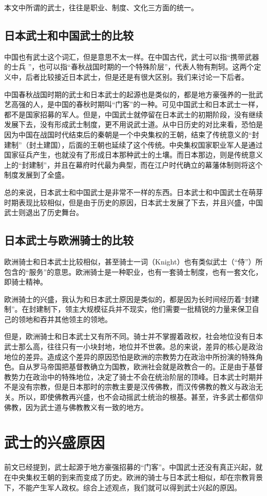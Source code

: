 \documentclass[utf8,a4paper]{ctexart}
\begin{document}
本文中所谓的武士，往往是职业、制度、文化三方面的统一。
\subsection{日本武士和中国武士的比较}
中国也有武士这个词汇，但是意思不太一样。在中国古代，武士可以指“携带武器的士兵
”，也可以指“春秋战国时期的一个特殊阶层”，代表人物有荆轲\cite{wushi13}。这两个定义中，后者比较接近日本武士，但是还是有很大区别。我们来讨论一下后者。

中国春秋战国时期的武士和日本武士的起源也是类似的，都是地方豪强养的一批武艺高强的人，是中国的春秋时期叫“门客”的一种。可见中国武士和日本武士一样，都不是国家招募的军人。但是，中国武士就停留在日本武士的初期阶段，没有继续发展下去，没有形成武士制度，更不用说武士道。从中日历史的对比来看，恐怕是因为中国在战国时代结束后的秦朝是一个中央集权的王朝，结束了传统意义的“封建制”（封土建国），后面的王朝也延续了这个传统。中央集权国家职业军人是通过国家征兵产生，也就没有了形成日本那种武士的土壤。而日本那边，则是传统意义上的“封建制”，并且在幕府时代最为典型，而在江户时代确立的幕藩体制则将这个制度发展到了全盛\cite{shi91}。

总的来说，日本武士和中国武士是非常不一样的东西。日本武士和中国武士在萌芽时期表现比较相似，但是由于历史的原因，日本武士发展了下去，并且兴盛，中国武士则退出了历史舞台。
\subsection{日本武士与欧洲骑士的比较}
欧洲骑士和日本武士比较相似，甚至骑士一词（Knight）也有类似武士（“侍”）所包含的“服务”的意思\cite{knight13}。欧洲骑士是一种职业，也有一套骑士制度，也有一套文化，即骑士精神。

欧洲骑士的兴盛，我认为和日本武士原因是类似的，都是因为长时间经历着“封建制”。在封建制下，领主大规模征兵并不现实，他们需要一批精锐的力量来保卫自己的领地和吞并其他领主的领地。

但是，欧洲骑士和日本武士又有所不同。骑士并不掌握着政权，社会地位没有日本武士那么高，往往只有一小块封地，地位并不世袭\cite{edge88}。总的来说，差异的核心是政治地位的差异。造成这个差异的原因恐怕是欧洲的宗教势力在政治中所扮演的特殊角色。自从罗马帝国把基督教确立为国教，欧洲社会就是政教合一的。正是由于基督教势力在政治中的特殊地位，决定了骑士不会在统治阶层的顶峰。日本武士时期并不是没有宗教，但是日本那时的宗教主要是汉传佛教，而汉传佛教的教义与政治无关。所以，即使佛教再兴盛，也不会动摇武士统治的根基。甚至，许多武士都信仰佛教，因为武士道与佛教教义有一致的地方\cite{liu99}。

\section{武士的兴盛原因}
前文已经提到，武士起源于地方豪强招募的“门客”。中国武士还没有真正兴起，就在中央集权王朝的到来而变成了历史。欧洲的骑士与日本武士相似，却在宗教背景下，不能产生军人政权。综合上述观点，我们就可以得到武士兴起的原因。
\end{document}
